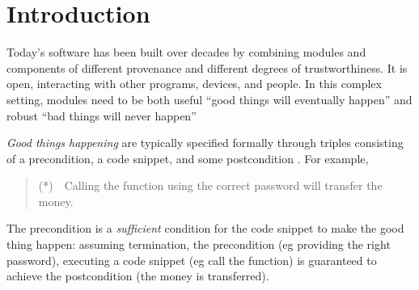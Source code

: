 

\section{Introduction}
\label{s:intro}

Today's   software has been built 
over decades by combining modules and components of
different provenance and different degrees of trustworthiness. It 
is open, interacting with other programs, devices, and people.
In this complex setting, modules need to be both useful ``good things
will eventually happen'' and  %
robust ``bad things will never happen'' %
 
\vspace{.03in}
\emph{Good things happening} are typically specified formally 
 through triples consisting of a  precondition, a code snippet, and some
 postcondition \cite{Hoare69}.
 For example,
 \begin{quote}
(*)\ \ Calling the  function using the correct password will transfer the money.
\end{quote}
The precondition is a \emph{sufficient} condition for the code snippet to
make the good thing happen: 
assuming termination, the precondition (eg providing the right 
password), executing a
code snippet (eg call  the  function) 
is guaranteed to achieve the postcondition (the money is transferred).

